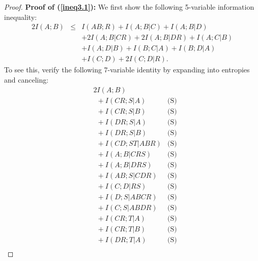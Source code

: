 \documentclass[10pt,journal]{IEEEtran}
\begin{document}
\begin{proof}
{\bf Proof of (\ref{ineq3.1}):}
We first show the following 5-variable information inequality:
\begin{eqnarray}\label{lem3.1}
   2I(A;B) &\le& I(AB;R)+I(A;B|C)+I(A;B|D) \nonumber\\
      && +2I(A;B|CR)+2I(A;B|DR)+I(A;C|B)\nonumber\\
      && +I(A;D|B)+I(B;C|A)+I(B;D|A)\nonumber\\
      && +I(C;D)+2I(C;D|R).
\end{eqnarray}
To see this, verify the following 7-variable identity by expanding into entropies
and canceling:
\begin{align*}
&2I(A;B)&\\
      &\ \  + I(CR;S|A)                                                         & \text{(S)} \\
      &\ \  + I(CR;S|B)                                                         & \text{(S)} \\
      &\ \  + I(DR;S|A)                                                         & \text{(S)} \\
      &\ \  + I(DR;S|B)                                                         & \text{(S)} \\
      &\ \  + I(CD;ST|ABR)                                                      & \text{(S)} \\
      &\ \  + I(A;B|CRS)                                                        & \text{(S)} \\
      &\ \  + I(A;B|DRS)                                                        & \text{(S)} \\
      &\ \  + I(AB;S|CDR)                                                       & \text{(S)} \\
      &\ \  + I(C;D|RS)                                                         & \text{(S)} \\
      &\ \  + I(D;S|ABCR)                                                       & \text{(S)} \\
      &\ \  + I(C;S|ABDR)                                                       & \text{(S)} \\
      &\ \  + I(CR;T|A)                                                         & \text{(S)} \\
      &\ \  + I(CR;T|B)                                                         & \text{(S)} \\
      &\ \  + I(DR;T|A)                                                         & \text{(S)} \\

\end{align*}
\end{proof}
\end{document}
